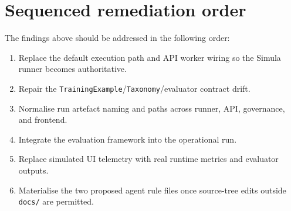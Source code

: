 \section{Sequenced remediation order}
The findings above should be addressed in the following order:
\begin{enumerate}[label=\arabic*.]
  \item Replace the default execution path and API worker wiring so
    the Simula runner becomes authoritative.
  \item Repair the \texttt{TrainingExample}/\texttt{Taxonomy}/evaluator
    contract drift.
  \item Normalise run artefact naming and paths across runner, API,
    governance, and frontend.
  \item Integrate the evaluation framework into the operational run.
  \item Replace simulated UI telemetry with real runtime metrics and
    evaluator outputs.
  \item Materialise the two proposed agent rule files once source-tree
    edits outside \texttt{docs/} are permitted.
\end{enumerate}
